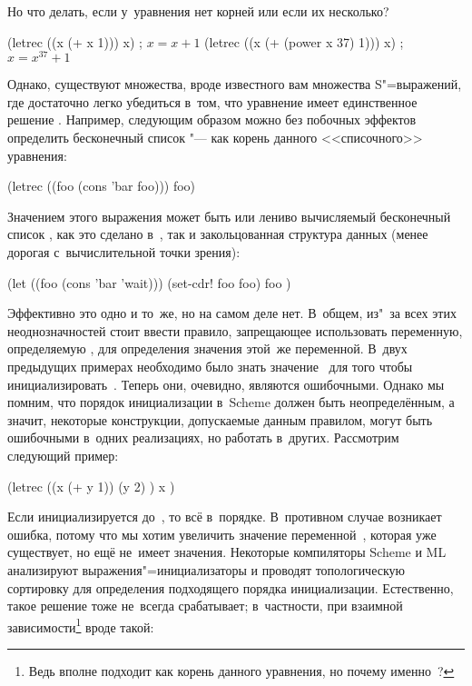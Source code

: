 Но что делать, если у~уравнения нет корней или если их несколько?

\begin{code:lisp}
(letrec ((x (+ x 1))) x)            ; $x = x + 1$
(letrec ((x (+ (power x 37) 1))) x) ; $x = x^{37} + 1$
\end{code:lisp}

Однако, существуют множества, вроде известного вам множества S"=выражений, где
достаточно легко убедиться в~том, что уравнение имеет единственное решение
\cite{ms80}. Например, следующим образом можно без побочных эффектов определить
бесконечный список "--- как корень данного <<списочного>> уравнения:

\begin{code:lisp}
(letrec ((foo (cons 'bar foo))) foo)
\end{code:lisp}

Значением этого выражения может быть или лениво вычисляемый бесконечный
список , как это сделано в~\cite{fw76,pj87}, так и
закольцованная структура данных (менее дорогая с~вычислительной точки зрения):

\begin{code:lisp}
(let ((foo (cons 'bar 'wait)))
  (set-cdr! foo foo)
  foo )
\end{code:lisp}

Эффективно это одно и то~же, но на самом деле нет. В~общем, из"~за всех этих
неоднозначностей стоит ввести правило, запрещающее использовать переменную,
определяемую , для определения значения этой~же переменной. В~двух
предыдущих примерах необходимо было знать значение~ для того чтобы
инициализировать~. Теперь они, очевидно, являются ошибочными. Однако мы
помним, что порядок инициализации в~Scheme должен быть неопределённым, а значит,
некоторые конструкции, допускаемые данным правилом, могут быть ошибочными
в~одних реализациях, но работать в~других. Рассмотрим следующий пример:

\begin{code:lisp}
(letrec ((x (+ y 1))
         (y 2) )
  x )
\end{code:lisp}

Если  инициализируется до~, то всё в~порядке. В~противном случае
возникает ошибка, потому что мы хотим увеличить значение переменной~,
которая уже существует, но ещё не~имеет значения. Некоторые компиляторы Scheme
и ML анализируют выражения"=инициализаторы и проводят топологическую сортировку
для определения подходящего порядка инициализации. Естественно, такое решение
тоже не~всегда срабатывает; в~частности, при взаимной зависимости\footnote{Ведь
 вполне подходит как корень данного уравнения, но почему
именно~?} вроде такой:

